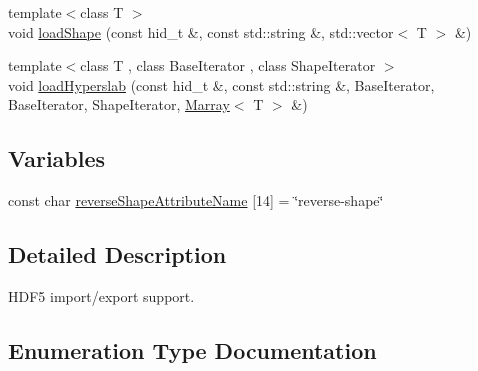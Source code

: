 \begin{DoxyCompactItemize}
\item 
{\footnotesize template$<$class T $>$ }\\void \hyperlink{namespaceandres_1_1hdf5_a9ce6bf731e79264846d466fd92eee01f}{load\+Shape} (const hid\+\_\+t \&, const std\+::string \&, std\+::vector$<$ T $>$ \&)
\item 
{\footnotesize template$<$class T , class Base\+Iterator , class Shape\+Iterator $>$ }\\void \hyperlink{namespaceandres_1_1hdf5_ab031fffd5429859c7f914d8f883a6224}{load\+Hyperslab} (const hid\+\_\+t \&, const std\+::string \&, Base\+Iterator, Base\+Iterator, Shape\+Iterator, \hyperlink{classandres_1_1Marray}{Marray}$<$ T $>$ \&)
\end{DoxyCompactItemize}
\subsection*{Variables}
\begin{DoxyCompactItemize}
\item 
const char \hyperlink{namespaceandres_1_1hdf5_acf79cfe1ea0769086a46970fd58188a7}{reverse\+Shape\+Attribute\+Name} \mbox{[}14\mbox{]} = \char`\"{}reverse-\/shape\char`\"{}
\end{DoxyCompactItemize}


\subsection{Detailed Description}
H\+D\+F5 import/export support. 

\subsection{Enumeration Type Documentation}
\hypertarget{namespaceandres_1_1hdf5_a08660935c7de0e1e76e007fc972933b9}{}
